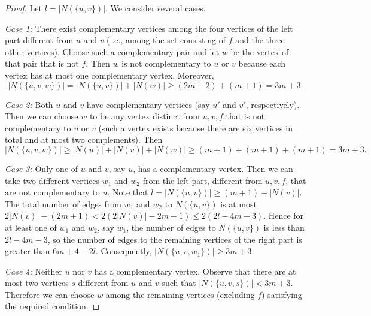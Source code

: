 \documentclass[10pt,a4paper]{amsart}
\renewcommand{\ge}{\geqslant}
\renewcommand{\le}{\leqslant}
\begin{document}
\begin{proof}
Let $l = |N(\{u,v\})|$. We consider several cases.

\emph{Case 1:} There exist complementary vertices among the four vertices of the left part different from $u$ and $v$ (i.e., among the set consisting of $f$ and the three other vertices). Choose such a complementary pair and let $w$ be the vertex of that pair that is not $f$. Then $w$ is not complementary to $u$ or $v$ because each vertex has at most one complementary vertex. Moreover,
\[
|N(\{u,v,w\})| = |N(\{u,v\})| + |N(w)| \ge (2m+2) + (m+1) = 3m+3.
\]

\emph{Case 2:} Both $u$ and $v$ have complementary vertices (say $u'$ and $v'$, respectively). Then we can choose $w$ to be any vertex distinct from $u,v,f$ that is not complementary to $u$ or $v$ (such a vertex exists because there are six vertices in total and at most two complements). Then
\[
|N(\{u,v,w\})| \ge |N(u)| + |N(v)| + |N(w)| \ge (m+1) + (m+1) + (m+1) = 3m+3.
\]

\emph{Case 3:} Only one of $u$ and $v$, say $u$, has a complementary vertex. Then we can take two different vertices $w_1$ and $w_2$ from the left part, different from $u,v,f$, that are not complementary to $u$. Note that $l = |N(\{u,v\})| \ge (m+1) + |N(v)|$. The total number of edges from $w_1$ and $w_2$ to $N(\{u,v\})$ is at most $2|N(v)| - (2m+1) < 2(2|N(v)| - 2m - 1) \le 2(2l - 4m - 3)$. Hence for at least one of $w_1$ and $w_2$, say $w_1$, the number of edges to $N(\{u,v\})$ is less than $2l - 4m - 3$, so the number of edges to the remaining vertices of the right part is greater than $6m+4 - 2l$. Consequently, $|N(\{u,v,w_1\})| \ge 3m+3$.

\emph{Case 4:} Neither $u$ nor $v$ has a complementary vertex. Observe that there are at most two vertices $s$ different from $u$ and $v$ such that $|N(\{u,v,s\})| < 3m+3$. Therefore we can choose $w$ among the remaining vertices (excluding $f$) satisfying the required condition.
\end{proof}
\end{document}
